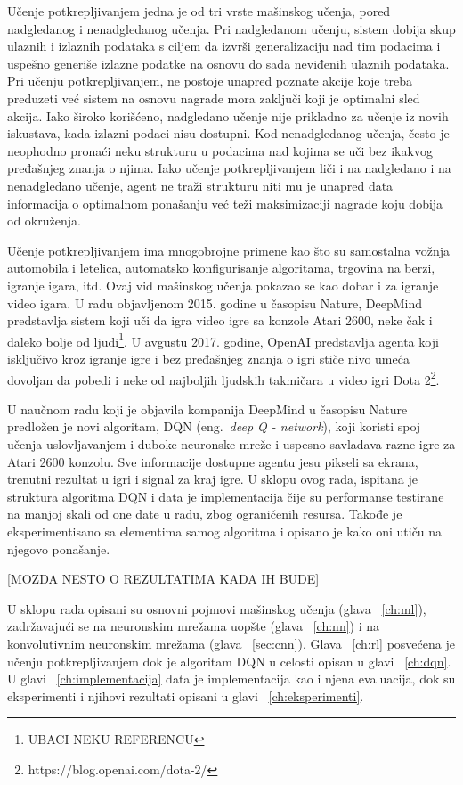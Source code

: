 Učenje potkrepljivanjem jedna je od tri vrste mašinskog učenja, pored nadgledanog i nenadgledanog učenja. Pri nadgledanom učenju, sistem dobija skup ulaznih i izlaznih podataka s ciljem da izvrši generalizaciju nad tim podacima i uspešno generiše izlazne podatke na osnovu do sada neviđenih ulaznih podataka. Pri učenju potkrepljivanjem, ne postoje unapred poznate akcije koje treba preduzeti već sistem na osnovu nagrade mora zaključi koji je optimalni sled akcija. Iako široko korišćeno, nadgledano učenje nije prikladno za učenje iz novih iskustava, kada izlazni podaci nisu dostupni.  Kod nenadgledanog učenja, često je neophodno pronaći neku strukturu u podacima nad kojima se uči bez ikakvog pređašnjeg znanja o njima. Iako učenje potkrepljivanjem liči i na nadgledano i na nenadgledano učenje, agent ne traži strukturu niti mu je unapred data informacija o optimalnom ponašanju već teži maksimizaciji nagrade koju dobija od okruženja. \par


Učenje potkrepljivanjem ima mnogobrojne primene kao što su samostalna vožnja automobila i letelica, automatsko konfigurisanje algoritama, trgovina na berzi, igranje igara, itd. Ovaj vid mašinskog učenja pokazao se kao dobar i za igranje video igara.  U radu objavljenom 2015. godine u časopisu Nature, DeepMind predstavlja sistem koji uči da igra video igre sa konzole Atari 2600, neke čak i daleko bolje od ljudi\footnote{UBACI NEKU REFERENCU}. U avgustu 2017. godine, OpenAI predstavlja agenta koji isključivo kroz igranje igre i bez pređašnjeg znanja o igri stiče nivo umeća dovoljan da pobedi i neke od najboljih ljudskih takmičara u video igri Dota 2\footnote{https://blog.openai.com/dota-2/}. 

U naučnom radu koji je objavila kompanija DeepMind u časopisu Nature predložen je novi algoritam, DQN (eng.~{\em deep Q - network}), koji koristi spoj učenja uslovljavanjem i duboke neuronske mreže i uspesno savladava razne igre za Atari 2600 konzolu. Sve informacije dostupne agentu jesu pikseli sa ekrana, trenutni rezultat u igri i signal za kraj igre.
U sklopu ovog rada, ispitana je struktura algoritma DQN i data je implementacija čije su performanse testirane na manjoj skali od one date u radu, zbog ograničenih resursa. Takođe je eksperimentisano sa elementima samog algoritma i opisano je kako oni utiču na njegovo ponašanje.


[MOZDA NESTO O REZULTATIMA KADA IH BUDE]


U sklopu rada opisani su osnovni pojmovi mašinskog učenja (glava ~\ref{ch:ml}), zadržavajući se na neuronskim mrežama uopšte (glava ~\ref{ch:nn}) i na konvolutivnim neuronskim mrežama (glava ~\ref{sec:cnn}). Glava ~\ref{ch:rl} posvećena je učenju potkrepljivanjem dok je algoritam DQN u celosti opisan u glavi ~\ref{ch:dqn}. U glavi ~\ref{ch:implementacija} data je implementacija kao i njena evaluacija, dok su eksperimenti i njihovi rezultati opisani u glavi ~\ref{ch:eksperimenti}. 